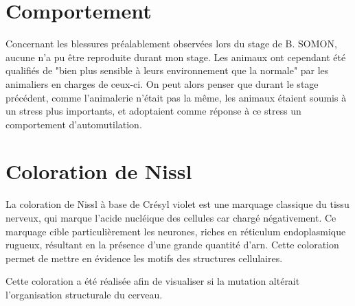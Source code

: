 \section{Comportement}
\label{sec:Comportement}
Concernant les blessures préalablement observées lors du stage de B. SOMON, aucune n'a pu être reproduite durant mon stage. Les animaux ont cependant été qualifiés de "bien plus sensible à leurs environnement que la normale" par les animaliers en charges de ceux-ci. On peut alors penser que durant le stage précédent, comme l'animalerie n'était pas la même, les animaux étaient soumis à un stress plus importants, et adoptaient comme réponse à ce stress un comportement d'automutilation.

\section{Coloration de Nissl}
\label{sec:NisslResultat}
La coloration de Nissl à base de Crésyl violet est une marquage classique du tissu nerveux, qui marque l'acide nucléique des cellules car chargé négativement. Ce marquage cible particulièrement les neurones, riches en réticulum endoplasmique rugueux, résultant en la présence d'une grande quantité d'\acrshort{arn}. Cette coloration permet de mettre en évidence les motifs des structures cellulaires.

Cette coloration a été réalisée afin de visualiser si la mutation \mcrd altérait l'organisation structurale du cerveau.

